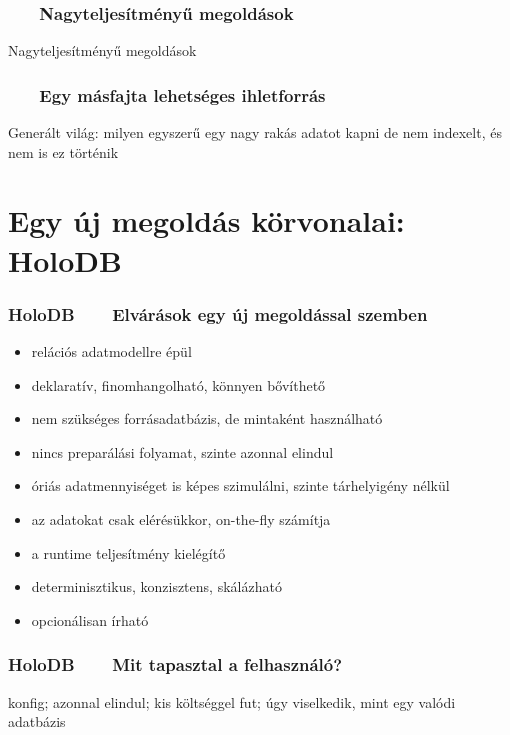\documentclass[
]{beamer}
\newcommand{\slidetitle}[2]{\frametitle{{\small #1 ~ \ding{226} ~ } \normalsize \textbf{#2} }}
\begin{document}
\begin{frame}
    \slidetitle{\sectionshorttitle}{Nagyteljesítményű megoldások}
    
    Nagyteljesítményű megoldások
\end{frame}

\begin{frame}
    \slidetitle{\sectionshorttitle}{Egy másfajta lehetséges ihletforrás}
    
    Generált világ: milyen egyszerű egy nagy rakás adatot kapni
    de nem indexelt, és nem is ez történik
\end{frame}

\section{Egy új megoldás körvonalai: HoloDB}
\def\sectionshorttitle{HoloDB}

\begin{frame}
    \slidetitle{\sectionshorttitle}{Elvárások egy új megoldással szemben}
    
    \begin{itemize}
        \setlength\itemsep{0.5em}
        \item relációs adatmodellre épül \pause
        \item deklaratív, finomhangolható, könnyen bővíthető \pause
        \item nem szükséges forrásadatbázis, de mintaként használható \pause
        \item nincs preparálási folyamat, szinte azonnal elindul \pause
        \item óriás adatmennyiséget is képes szimulálni, szinte tárhelyigény nélkül \pause
        \item az adatokat csak elérésükkor, on-the-fly számítja \pause
        \item a runtime teljesítmény kielégítő \pause
        \item determinisztikus, konzisztens, skálázható \pause
        \item opcionálisan írható
    \end{itemize}
\end{frame}

\begin{frame}
    \slidetitle{\sectionshorttitle}{Mit tapasztal a felhasználó?}
    
    konfig;
    azonnal elindul;
    kis költséggel fut;
    úgy viselkedik, mint egy valódi adatbázis
\end{frame}
\end{document}

